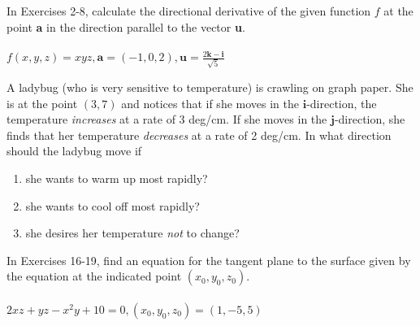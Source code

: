 \documentclass[12pt,letterpaper]{hmcpset}
\begin{document}
\begin{problem}[2.6.6]
    In Exercises 2-8, calculate the directional derivative of the
    given function $f$ at the point \textbf{a} in the direction
    parallel to the vector \textbf{u}.\\\\
    $\displaystyle f(x,y,z)=xyz,\textbf{a}=(-1,0,2),
    \textbf{u}=\frac{2\textbf{k}-\textbf{i}}{\sqrt{5}}$
\end{problem}
\begin{solution}
    \vfill
\end{solution}
\newpage

\begin{problem}[2.6.12]
    A ladybug (who is very sensitive to temperature) is crawling on
    graph paper. She is at the point $(3,7)$ and notices that if she
    moves in the $\textbf{i}$-direction, the temperature
    \textit{increases} at a rate of 3 deg/cm. If she moves in the
    $\textbf{j}$-direction, she finds that her temperature
    \textit{decreases} at a rate of 2 deg/cm. In what direction should
    the ladybug move if
    \begin{enumerate}
        \item she wants to warm up most rapidly?
        \item she wants to cool off most rapidly?
        \item she desires her temperature \textit{not} to change?
    \end{enumerate}
\end{problem}
\begin{solution}
    \vfill
\end{solution}
\newpage

\begin{problem}[2.6.18]
    In Exercises 16-19, find an equation for the tangent plane to the
    surface given by the equation at the indicated point
    $(x_0,y_0,z_0)$.\\\\
    $2xz+yz-x^2y+10=0,(x_0,y_0,z_0)=(1,-5,5)$
\end{problem}
\begin{solution}
    \vfill
\end{solution}
\end{document}
